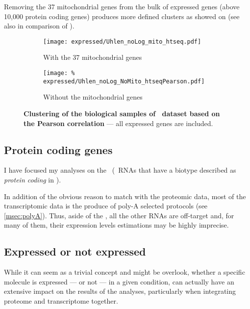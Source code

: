 Removing the 37 mitochondrial genes from the bulk of expressed genes
(above 10,000 protein coding genes) produces more defined clusters as showed on
 (see also  in comparison
of ).

\begin{figure}
    \centering
    \begin{subfigure}[b]{0.75\textwidth}
        \centering
        \texttt{[image: expressed/Uhlen\_noLog\_mito\_htseq.pdf]}
        \caption{With the 37 mitochondrial genes}\label{fig:withMito}
    \end{subfigure}

    \begin{subfigure}[b]{0.75\textwidth}
        \centering
        \texttt{[image: \%
            expressed/Uhlen\_noLog\_NoMito\_htseqPearson.pdf]}
        \caption{Without the mitochondrial genes}\label{fig:NoMito}
    \end{subfigure}
    \caption[Clustering of the biological samples of \uhlen\
    dataset based on the Pearson correlation]{\label{fig:MitoNomito}\textbf{Clustering
    of the biological samples of \uhlen\ dataset based on the Pearson correlation}
    --- all expressed genes are included.}
\end{figure}


\subsection{Protein coding genes}\label{subsec:protcodingOnly}
I have focused my analyses on the \mRNAs\ (\ie\ \glspl{RNA} that have a
biotype described as \emph{protein coding} in \ens{76}).

In addition of the obvious reason to match with the proteomic data,
most of the transcriptomic data is the produce of poly-A selected protocols
(see \cref{msec:polyA}).
Thus, aside of the \mRNAs, all the other \glspl{RNA} are off-target
and, for many of them,
their expression levels estimations may be highly imprecise.



\subsection{Expressed or not expressed}
\label{sec:ExpressedOrNot}

While it can seem as a trivial concept and might be overlook, whether a specific
molecule is expressed --- or not --- in a given condition, can actually have
an extensive impact on the results of the analyses, particularly when integrating
proteome and transcriptome together.

